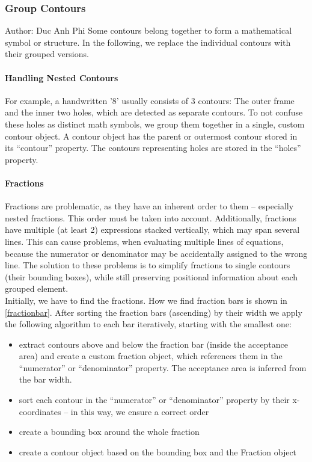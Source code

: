 \documentclass[11pt]{article}
\begin{document}
	\subsubsection{Group Contours}
	\small{Author: Duc Anh Phi} \newline \newline
	Some contours belong together to form a mathematical symbol or structure. In the following, we replace the individual contours with their grouped versions.
	
	\paragraph{Handling Nested Contours}
	For example, a handwritten '8' usually consists of 3 contours: The outer frame and the inner two holes, which are detected as separate contours.
	To not confuse these holes as distinct math symbols, we group them together in a single, custom contour object.
	A contour object has the parent or outermost contour stored in its “contour” property.
	The contours representing holes are stored in the “holes” property.
	
	\paragraph{Fractions}
	Fractions are problematic, as they have an inherent order to them – especially nested fractions.
	This order must be taken into account. Additionally, fractions have multiple (at least 2) expressions stacked vertically, which may span several lines.
	This can cause problems, when evaluating multiple lines of equations, because the numerator or denominator may be accidentally assigned to the wrong line.
	The solution to these problems is to simplify fractions to single contours (their bounding boxes), while still preserving positional information about each grouped element.\\
	Initially, we have to find the fractions. How we find fraction bars is shown in \ref{fractionbar}. After sorting the fraction bars (ascending) by their width we apply the following algorithm to each bar iteratively, starting with the smallest one:
	\begin{itemize}
		\item extract contours above and below the fraction bar (inside the acceptance area) and create a custom fraction object, which references them in the “numerator” or “denominator” property. The acceptance area is inferred from the bar width.
		\item sort each contour in the “numerator” or “denominator” property by their x-coordinates – in this way, we ensure a correct order
		\item create a bounding box around the whole fraction
		\item create a contour object based on the bounding box and the Fraction object
	\end{itemize}
\end{document}
